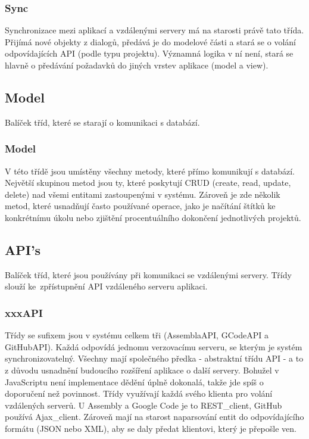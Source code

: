 \subsubsection{Sync}

Synchronizace mezi aplikací a vzdálenými servery má na starosti právě tato třída. Přijímá nové objekty z dialogů, předává je do modelové části a stará se o volání odpovídajících API (podle typu projektu). Významná logika v ní není, stará se hlavně o předávání požadavků do jiných vrstev aplikace (model a view).

\subsection{Model}

Balíček tříd, které se starají o komunikaci s databází.

\subsubsection{Model}

V této třídě jsou umístěny všechny metody, které přímo komunikují s databází. Největší skupinou metod jsou ty, které poskytují CRUD (create, read, update, delete) nad všemi entitami zastoupenými v systému. Zároveň je zde několik metod, které usnadňují často používané operace, jako je načítání štítků ke konkrétnímu úkolu nebo zjištění procentuálního dokončení jednotlivých projektů.

\subsection{API's}

Balíček tříd, které jsou používány při komunikaci se vzdálenými servery. Třídy slouží ke~zpřístupnění API vzdáleného serveru aplikaci.

\subsubsection{xxxAPI}

Třídy se sufixem  jsou v systému celkem tři (AssemblaAPI, GCodeAPI a GitHubAPI). Každá odpovídá jednomu verzovacímu serveru, se kterým je systém synchronizovatelný. Všechny mají společného předka - abstraktní třídu API - a to z důvodu usnadnění budoucího rozšíření aplikace o další servery. Bohužel v JavaScriptu není implementace dědění úplně dokonalá, takže jde spíš o doporučení než povinnost. Třídy využívají každá svého klienta pro volání vzdálených serverů. U Assembly a Google Code je to REST\_client, GitHub používá Ajax\_client. Zároveň mají na starost naparsování entit do odpovídajícího formátu (JSON nebo XML), aby se daly předat klientovi, který je přepošle ven.

